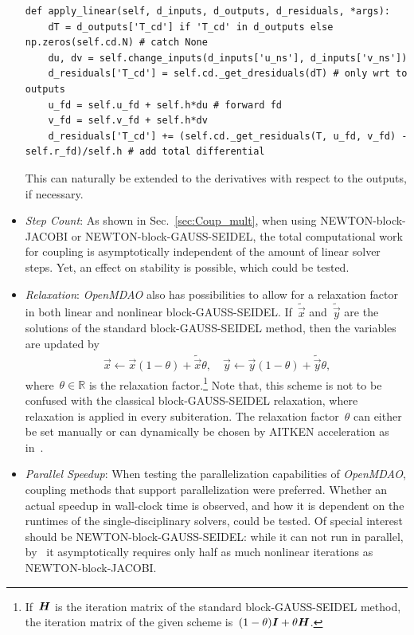 \documentclass[10pt, ngerman, english,
twoside, open=right,
numbers=noenddot,
declaration=section,
abstract=section,
abstract=multiple,
abstract=notoc,
declaration=notoc,
cd=pale, 
chapterprefix=off, 
chapterpage=false, 
headingsvskip=-10em,
cdgeometry=custom, 
slantedgreek=on,
cdmath=on, 
cdfont=on,
ttfont=false,
mathswap=off,
]{tudscrreprt}
\numberwithin{equation}{chapter}
\renewcommand{\textsc}[1]{\uppercase{\mbox{#1}}}
\begin{document}
\begin{itemize}
\begin{lstlisting}[firstnumber=27]
def apply_linear(self, d_inputs, d_outputs, d_residuals, *args):
    dT = d_outputs['T_cd'] if 'T_cd' in d_outputs else np.zeros(self.cd.N) # catch None
    du, dv = self.change_inputs(d_inputs['u_ns'], d_inputs['v_ns'])
    d_residuals['T_cd'] = self.cd._get_dresiduals(dT) # only wrt to outputs
    u_fd = self.u_fd + self.h*du # forward fd
    v_fd = self.v_fd + self.h*dv
    d_residuals['T_cd'] += (self.cd._get_residuals(T, u_fd, v_fd) - self.r_fd)/self.h # add total differential
\end{lstlisting}
This can naturally be extended to the derivatives with respect to the outputs, if necessary.
\item \textit{Step Count}: As shown in Sec.~\ref{sec:Coup_mult}, when using \textsc{Newton}-block-\textsc{Jacobi} or \textsc{Newton}-block-\textsc{Gau\ss}-\textsc{Seidel}, the total computational work for coupling is asymptotically independent of the amount of linear solver steps. Yet, an effect on stability is possible, which could be tested.
\item \textit{Relaxation}: \textit{OpenMDAO} also has possibilities to allow for a relaxation factor in both linear and nonlinear block-\textsc{Gau\ss}-\textsc{Seidel}. If~$\tilde{\vec{x}}$ and~$\tilde{\vec{y}}$ are the solutions of the standard block-\textsc{Gau\ss}-\textsc{Seidel} method, then the variables are updated by
\begin{align*}
\vec{x} \gets \vec{x} (1-\theta) + \tilde{\vec{x}} \theta, \quad \vec{y} \gets \vec{y} (1-\theta) + \tilde{\vec{y}} \theta\text{,}
\end{align*} 
where~$\theta \in \mathbb{R}$ is the relaxation factor.\footnote{If~$\boldsymbol{H}$ is the iteration matrix of the standard block-\textsc{Gau\ss}-\textsc{Seidel} method, the iteration matrix of the given scheme is~$(1-\theta)\boldsymbol{I} + \theta \boldsymbol{H}$.} Note that, this scheme is not to be confused with the classical block-\textsc{Gau\ss}-\textsc{Seidel} relaxation, where relaxation is applied in every subiteration. 
The relaxation factor~$\theta$ can either be set manually or can dynamically be chosen by \textsc{Aitken} acceleration as in~\cite{OpenMDAOAitken}.
\item \textit{Parallel Speedup}: When testing the parallelization capabilities of \textit{OpenMDAO}, coupling methods that support parallelization were preferred. Whether an actual speedup in wall-clock time is observed, and how it is dependent on the runtimes of the single-disciplinary solvers, could be tested. Of special interest should be \textsc{Newton}-block-\textsc{Gau\ss}-\textsc{Seidel}: while it can not run in parallel, by~\cite[see][Th.~10.3.1]{Ortega} it asymptotically requires only half as much nonlinear iterations as \textsc{Newton}-block-\textsc{Jacobi}.
\end{itemize}
\end{document}

